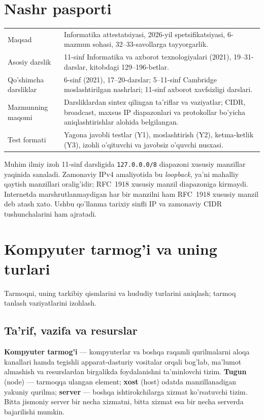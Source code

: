 \documentclass[11pt,a4paper,oneside]{book}
\newcommand{\kw}[1]{\textbf{\color{Deep}#1}}
\newcommand{\ip}[1]{\texttt{#1}}
\begin{document}
\chapter*{Nashr pasporti}
\par\medskip
\par\medskip
\begin{tabularx}{\textwidth}{p{}Y}\toprule
Maqsad & Informatika attestatsiyasi, 2026-yil spetsifikatsiyasi, 6-mazmun sohasi, 32--33-savollarga tayyorgarlik.\\
Asosiy darslik & 11-sinf Informatika va axborot texnologiyalari (2021), 19--31-darslar, kitobdagi 129--196-betlar.\\
Qo'shimcha darsliklar & 6-sinf (2021), 17--20-darslar; 5--11-sinf Cambridge moslashtirilgan nashrlari; 11-sinf axborot xavfsizligi darslari.\\
Mazmunning maqomi & Darsliklardan sintez qilingan ta'riflar va vaziyatlar; CIDR, broadcast, maxsus IP diapazonlari va protokollar bo'yicha aniqlashtirishlar alohida belgilangan.\\
Test formati & Yagona javobli testlar (Y1), moslashtirish (Y2), ketma-ketlik (Y3), izohli o'qituvchi va javobsiz o'quvchi nusxasi.\\
\bottomrule\end{tabularx}
\begin{caution}{Muhim ilmiy izoh}
11-sinf darsligida \ip{127.0.0.0/8} diapazoni xususiy manzillar yaqinida sanaladi. Zamonaviy IPv4 amaliyotida bu \emph{loopback}, ya'ni mahalliy qaytish manzillari oralig'idir; RFC~1918 xususiy manzil diapazoniga kirmaydi. Internetda marshrutlanmaydigan har bir manzilni ham RFC~1918 xususiy manzil deb atash xato. Ushbu qo'llanma tarixiy sinfli IP va zamonaviy CIDR tushunchalarini ham ajratadi.
\end{caution}
\tableofcontents
\mainmatter
\chapter{Kompyuter tarmog'i va uning turlari}
\begin{goal}Tarmoqni, uning tarkibiy qismlarini va hududiy turlarini aniqlash; tarmoq tanlash vaziyatlarini izohlash.\end{goal}
\section{Ta'rif, vazifa va resurslar}
\kw{Kompyuter tarmog'i} — kompyuterlar va boshqa raqamli qurilmalarni aloqa kanallari hamda tegishli apparat-dasturiy vositalar orqali bog'lab, ma'lumot almashish va resurslardan birgalikda foydalanishni ta'minlovchi tizim. \kw{Tugun} (node) — tarmoqqa ulangan element; \kw{xost} (host) odatda manzillanadigan yakuniy qurilma; \kw{server} — boshqa ishtirokchilarga xizmat ko'rsatuvchi tizim. Bitta jismoniy server bir necha xizmatni, bitta xizmat esa bir necha serverda bajarilishi mumkin.
\end{document}
